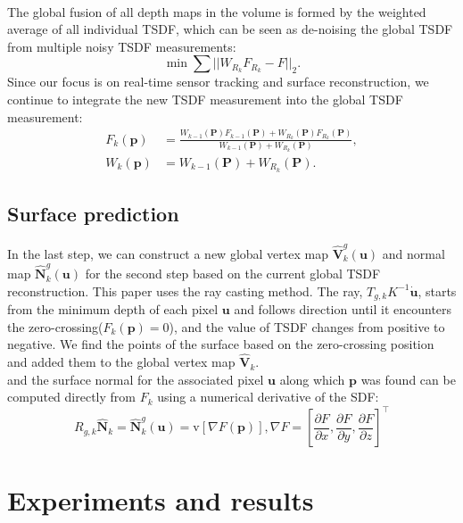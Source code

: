 \documentclass[a4paper,12pt]{article}
\begin{document}
\\The global fusion of all depth maps in the volume is formed by the weighted average of all individual TSDF, which can be seen as de-noising the global TSDF from multiple noisy TSDF measurements:
\begin{equation}
	\min\sum||W_{R_k}F_{R_k}-F||_2.
	\label{equ16}
\end{equation}
Since our focus is on real-time sensor tracking and surface reconstruction, we continue to integrate the new TSDF measurement into the global TSDF measurement:
\begin{align}
	F_k(\mathbf{p})&=\frac{W_{k-1}(\mathbf{P})F_{k-1}(\mathbf{P})+W_{R_k}(\mathbf{P})F_{R_k}(\mathbf{P})}{W_{k-1}(\mathbf{P})+W_{R_k}(\mathbf{P})},\\
	W_k(\mathbf{p})&=W_{k-1}(\mathbf{P})+W_{R_k}(\mathbf{P}).
\end{align}
\subsection{Surface prediction}
In the last step, we can construct a new global vertex map $\hat{\mathbf{V}}_k^g(\mathbf{u})$ and normal map $\hat{\mathbf{N}}_k^g(\mathbf{u})$ for the second step based on the current global TSDF reconstruction.
This paper uses the ray casting method. 
The ray, $T_{g,k}K^{-1}\dot{\mathbf{u}}$, starts from the minimum depth of each pixel $\mathbf{u}$ and follows direction until it encounters the zero-crossing($F_k(\mathbf{p})=0$), and the value of TSDF changes from positive to negative. 
We find the points of the surface based on the zero-crossing position and added them to the global vertex map $\mathbf{\hat{V}}_k$.
\\and the surface normal for the associated pixel $\mathbf{u}$ along which $\mathbf{p}$ was found can be computed directly from $F_k$ using a numerical derivative of the SDF:
\begin{equation}
	R_{g,k}\hat{\mathbf{N}}_k=\hat{\mathbf{N}}_k^g(\mathbf{u})=\text{v}[\nabla F(\mathbf{p})],\nabla F=\left[ \frac{\partial F}{\partial x},\frac{\partial F}{\partial y},\frac{\partial F}{\partial z} \right]^\top
	\label{equ17}
\end{equation}
\section{Experiments and results}
\end{document}
